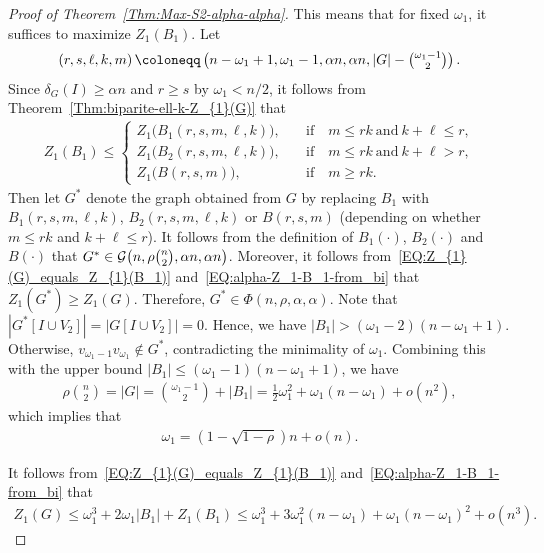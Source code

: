 \documentclass[11pt,a4paper]{article}
\begin{document}
\begin{proof}[Proof of Theorem~\ref{Thm:Max-S2-alpha-alpha}]
This means that for fixed $\omega_1$, it suffices to maximize $Z_{1}(B_1)$. 
Let 
\begin{align*}
\left(r,s,\ell,k,m\right) 
\coloneqq \left(n- \omega_1 +1, \omega_1 -1, \alpha n, \alpha n, |G|- \tbinom{\omega_1-1}{2}\right). 
\end{align*}
Since $\delta_{G}(I) \ge \alpha n$ and $r \ge s$ by $\omega_1 < n/2$, it follows from Theorem~\ref{Thm:biparite-ell-k-Z_{1}(G)} that 
\begin{align}\label{EQ:alpha-Z_1-B_1-from_bi}
 Z_{1}(B_1)
        \le 
        \begin{cases}
            Z_{1}\big(B_1(r,s,m,\ell,k) \big), &\quad\text{if}\quad m \le rk ~\text{and}~ k + \ell \le r, \\[0.5em]
            Z_{1}\big(B_2(r,s,m,\ell,k) \big), &\quad\text{if}\quad m \le rk ~\text{and}~ k + \ell > r, \\[0.5em]
            Z_{1}\big(B(r,s,m) \big), &\quad\text{if}\quad m \ge r k. 
        \end{cases}
\end{align}
Then let $G^{\ast}$ denote the graph obtained from $G$ by replacing $B_1$ with $B_1(r,s,m,\ell,k)$, $B_2(r,s,m,\ell,k)$ or $B(r,s,m)$ (depending on whether $m \le rk$ and $k + \ell \le r$). 
It follows from the definition of $B_1(\cdot)$, $B_2(\cdot)$ and $B(\cdot)$ that $G^{\ast} \in \mathcal{G}\big(n,\rho \tbinom{n}{2}, \alpha n, \alpha n \big)$. 
Moreover, it follows from~\eqref{EQ:Z_{1}(G)_equals_Z_{1}(B_1)} and~\eqref{EQ:alpha-Z_1-B_1-from_bi} that $Z_{1}(G^{\ast}) \ge Z_{1}(G)$. 
Therefore, $G^{\ast} \in \Phi(n, \rho, \alpha, \alpha)$. 
Note that $\left|G^{\ast}[I \cup V_2]\right| = \left|G[I \cup V_2]\right| = 0$. 
Hence, we have $|B_1| > (\omega_1 -2 )(n-\omega_1 +1)$. 
Otherwise, $v_{\omega_1-1} v_{\omega_1} \not\in G^{\ast}$, contradicting the minimality of $\omega_1$. 
Combining this with the upper bound $|B_1| \le (\omega_1 -1)(n- \omega_1 +1)$, we have  
\begin{align*}
\rho \binom{n}{2} 
= |G| 
= \binom{\omega_1 -1}{2} + |B_1|
= \frac{1}{2} \omega_1^2 + \omega_1 (n -\omega_1) + o(n^2), 
\end{align*}
which implies that 
\begin{align}\label{EQ:alpha-calculation-w_1}
\omega_1 
= \left(1-\sqrt{1-\rho} \right)n +o(n). 
\end{align}

It follows from~\eqref{EQ:Z_{1}(G)_equals_Z_{1}(B_1)} and~\eqref{EQ:alpha-Z_1-B_1-from_bi} that 
\begin{align}\label{EQ:alpha-calculation-w_1-Z_1(G)}
Z_{1}(G) 
\le \omega_1^3 + 2\omega_1 |B_1| + Z_{1}(B_1)
\le \omega_1^3 + 3\omega_1^2(n-\omega_1) + \omega_1(n-\omega_1)^2 + o(n^3). 
\end{align}


\end{proof}
\end{document}
